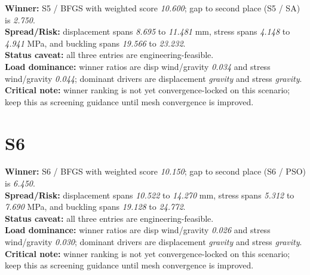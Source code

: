\begin{samepage}
\noindent \textbf{Winner:} S5 / BFGS with weighted score \textit{10.600}; gap to second place (S5 / SA) is \textit{2.750}.\\
\noindent \textbf{Spread/Risk:} displacement spans \textit{8.695} to \textit{11.481} mm, stress spans \textit{4.148} to \textit{4.941} MPa, and buckling spans \textit{19.566} to \textit{23.232}.\\
\noindent \textbf{Status caveat:} all three entries are engineering-feasible.\\
\noindent \textbf{Load dominance:} winner ratios are disp wind/gravity \textit{0.034} and stress wind/gravity \textit{0.044}; dominant drivers are displacement \textit{gravity} and stress \textit{gravity}.\\
\noindent \textbf{Critical note:} winner ranking is not yet convergence-locked on this scenario; keep this as screening guidance until mesh convergence is improved.
\end{samepage}


\section{S6}


\begin{table}[H]
\centering
\scriptsize
\setlength{\tabcolsep}{4pt}
\renewcommand{\arraystretch}{1.1}
\end{table}


\begin{samepage}
\noindent \textbf{Winner:} S6 / BFGS with weighted score \textit{10.150}; gap to second place (S6 / PSO) is \textit{6.450}.\\
\noindent \textbf{Spread/Risk:} displacement spans \textit{10.522} to \textit{14.270} mm, stress spans \textit{5.312} to \textit{7.690} MPa, and buckling spans \textit{19.128} to \textit{24.772}.\\
\noindent \textbf{Status caveat:} all three entries are engineering-feasible.\\
\noindent \textbf{Load dominance:} winner ratios are disp wind/gravity \textit{0.026} and stress wind/gravity \textit{0.030}; dominant drivers are displacement \textit{gravity} and stress \textit{gravity}.\\
\noindent \textbf{Critical note:} winner ranking is not yet convergence-locked on this scenario; keep this as screening guidance until mesh convergence is improved.
\end{samepage}



